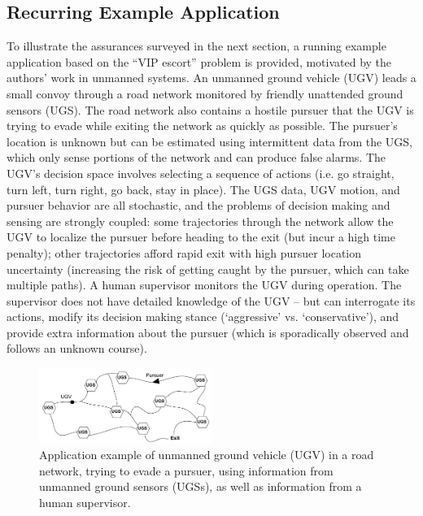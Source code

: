 \subsection{Recurring Example Application}
    To illustrate the assurances surveyed in the next section, a running example application based on the ``VIP escort'' problem \cite{Humphrey2012-lr} is provided, motivated by the authors' work in unmanned systems. 
    An unmanned ground vehicle (UGV) leads a small convoy through a road network monitored by friendly unattended ground sensors (UGS). The road network also contains a hostile pursuer that the UGV is trying to evade while exiting the network as quickly as possible. 
    The pursuer's location is unknown but can be estimated using intermittent data from the UGS, which only sense portions of the network and can produce false alarms. The UGV's decision space involves selecting a sequence of actions (i.e. go straight, turn left, turn right, go back, stay in place). The UGS data, UGV motion, and pursuer behavior are all stochastic, and the problems of decision making and sensing are strongly coupled: some trajectories through the network allow the UGV to localize the pursuer before heading to the exit (but incur a high time penalty); other trajectories afford rapid exit with high pursuer location uncertainty (increasing the risk of getting caught by the pursuer, which can take multiple paths). 
    A human supervisor monitors the UGV during operation. 
    The supervisor does not have detailed knowledge of the UGV -- but can interrogate its actions, modify its decision making stance (`aggressive' vs. `conservative'), and provide extra information about the pursuer (which is sporadically observed and follows an unknown course). %
    
	\begin{figure}[t]%
    	\centering
     	\includegraphics[width=0.5\textwidth]{Figures/RoadNet}
    	\caption{Application example of unmanned ground vehicle (UGV) in a road network, trying to evade a pursuer, using information from unmanned ground sensors (UGSs), as well as information from a human supervisor.} %
        \label{fig:RoadNet}
    \end{figure}


